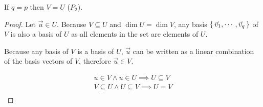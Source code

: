\begin{question}
	If $q=p$ then $V=U$ ($P_2$).

	\begin{proof}
		Let $\vec u \in U$. Because $V\subseteq U$ and $\dim U = \dim V$, any basis $\set{\vec v_1, \cdots, \vec v_q}$ of $V$ is also a basis of $U$ as all elements in the set are elements of $U$.

		Because any basis of $V$ is a basis of $U$, $\vec u$ can be written as a linear combination of the basis vectors of $V$, therefore $\vec u \in V$.

		\begin{align*}
			u \in V \wedge u \in U \implies U \subseteq V     \\
			V \subseteq U \wedge U \subseteq V \implies U = V \\
		\end{align*}
	\end{proof}
\end{question}
